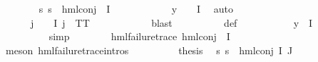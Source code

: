 \begin{isabellebody}
\ \ \ \ \ \ \isamarkupfalse%
\ {\isachardoublequoteopen}{\isasymforall}s{\isachardot}{\kern0pt}\ {\isasymnot}s\ {\isasymTurnstile}\ {\isacharparenleft}{\kern0pt}hml{\isacharunderscore}{\kern0pt}conj\ {\isacharbraceleft}{\kern0pt}{\isacharbraceright}{\kern0pt}\ I\ {\isasymPsi}{\isacharparenright}{\kern0pt}{\isachardoublequoteclose}\ \isanewline
\ \ \ \ \ \ \ \ \isamarkupfalse%
\ {\isacartoucheopen}y\ {\isasymin}\ {\isasymPhi}\ {\isacharbackquote}{\kern0pt}\ I{\isacartoucheclose}\ \isamarkupfalse%
\ auto\isanewline
\ \ \ \ \ \ \isamarkupfalse%
\ {\isachardoublequoteopen}{\isasymPsi}\ {\isacharbackquote}{\kern0pt}\ {\isacharbraceleft}{\kern0pt}{\isacharbraceright}{\kern0pt}\ {\isacharequal}{\kern0pt}\ {\isacharbraceleft}{\kern0pt}{\isacharbraceright}{\kern0pt}{\isachardoublequoteclose}\ {\isachardoublequoteopen}{\isasymforall}j\ {\isasymin}\ {\isasymPsi}\ {\isacharbackquote}{\kern0pt}\ I{\isachardot}{\kern0pt}\ j\ {\isacharequal}{\kern0pt}\ TT{\isachardoublequoteclose}\ \isanewline
\ \ \ \ \ \ \ \ \ \isamarkupfalse%
\ blast\isanewline
\ \ \ \ \ \ \ \ \isamarkupfalse%
\ {\isasymPsi}{\isacharunderscore}{\kern0pt}def\ \isanewline
\ \ \ \ \ \ \ \ \isamarkupfalse%
\ {\isacartoucheopen}y\ {\isasymin}\ {\isasymPhi}{\isacharbackquote}{\kern0pt}I{\isacartoucheclose}\ \isanewline
\ \ \ \ \ \ \ \ \isamarkupfalse%
\ simp\isanewline
\ \ \ \ \ \ \isamarkupfalse%
\ {\isachardoublequoteopen}hml{\isacharunderscore}{\kern0pt}failure{\isacharunderscore}{\kern0pt}trace\ {\isacharparenleft}{\kern0pt}hml{\isacharunderscore}{\kern0pt}conj\ {\isacharbraceleft}{\kern0pt}{\isacharbraceright}{\kern0pt}\ I\ {\isasymPsi}{\isacharparenright}{\kern0pt}{\isachardoublequoteclose}\ \isanewline
\ \ \ \ \ \ \ \ \isamarkupfalse%
\ {\isacharparenleft}{\kern0pt}meson\ hml{\isacharunderscore}{\kern0pt}failure{\isacharunderscore}{\kern0pt}trace{\isachardot}{\kern0pt}intros{\isacharparenleft}{\kern0pt}{}{\isacharparenright}{\kern0pt}{\isacharparenright}{\kern0pt}\isanewline
\ \ \ \ \ \ \isamarkupfalse%
\ \isamarkupfalse%
\ {\isacharquery}{\kern0pt}thesis\ \isamarkupfalse%
\ {\isacartoucheopen}{\isasymforall}s{\isachardot}{\kern0pt}\ {\isasymnot}s\ {\isasymTurnstile}\ {\isacharparenleft}{\kern0pt}hml{\isacharunderscore}{\kern0pt}conj\ I\ J\ {\isasymPhi}{\isacharparenright}{\kern0pt}{\isacartoucheclose}\ \isanewline
\ \ \ \ \ \ \ \ \isamarkupfalse%

\end{isabellebody}
